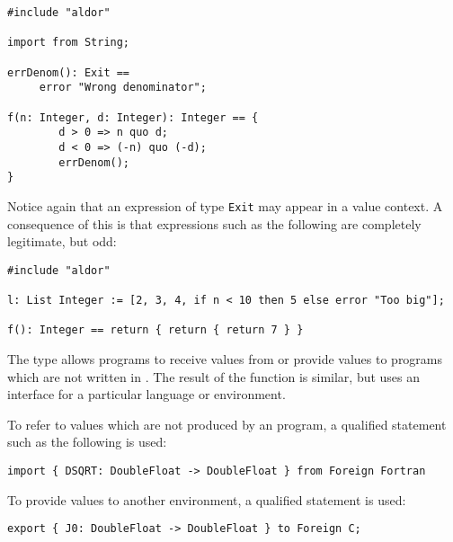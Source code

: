 \begin{small}
\begin{verbatim}
#include "aldor"

import from String;

errDenom(): Exit ==
     error "Wrong denominator";

f(n: Integer, d: Integer): Integer == {
        d > 0 => n quo d;
        d < 0 => (-n) quo (-d);
        errDenom();
}
\end{verbatim}
\end{small}

Notice again that an expression of type \verb"Exit" 
may appear in a value context.
A consequence of this is that expressions such as the following are
completely legitimate, but odd:

\begin{small}%
\begin{verbatim}
#include "aldor"

l: List Integer := [2, 3, 4, if n < 10 then 5 else error "Too big"];

f(): Integer == return { return { return 7 } }
\end{verbatim}
\end{small}

%
The type  allows programs to receive values from
or provide values to programs which are not written in \asharp{}.
The result of the function  is similar, 
but uses an interface for a particular language or environment.  

To refer to values which are not produced by an \asharp{} program,
a qualified  statement such as the following is used:

\begin{small}
\begin{verbatim}
import { DSQRT: DoubleFloat -> DoubleFloat } from Foreign Fortran
\end{verbatim}
\end{small}

To provide values to another environment, 
a qualified  statement is used:

\begin{small}
\begin{verbatim}
export { J0: DoubleFloat -> DoubleFloat } to Foreign C;
\end{verbatim}
\end{small}

